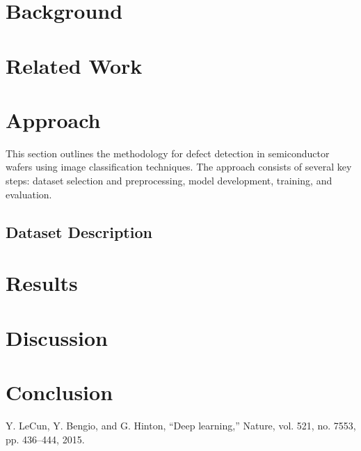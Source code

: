 \documentclass[conference]{IEEEtran}
\begin{document}
\section{Background}


\section{Related Work} 


\section{Approach} 
This section outlines the methodology for defect detection in semiconductor wafers using image classification techniques.
The approach consists of several key steps: dataset selection and preprocessing, model development, training, and evaluation.

\subsection{Dataset Description}


\section{Results} 


\section{Discussion}


\section{Conclusion}


\begin{thebibliography}{00}
 Y. LeCun, Y. Bengio, and G. Hinton, “Deep learning,” Nature, vol. 521, no. 7553, pp. 436–444, 2015.

\end{thebibliography}
\end{document}
